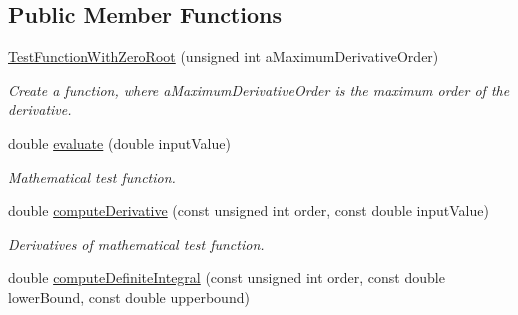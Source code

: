 \subsection*{Public Member Functions}
\begin{DoxyCompactItemize}
\item 
\hyperlink{structtudat_1_1unit__tests_1_1TestFunctionWithZeroRoot_a6c33e4dde20b4c5140187202cdb61990}{Test\+Function\+With\+Zero\+Root} (unsigned int a\+Maximum\+Derivative\+Order)\hypertarget{structtudat_1_1unit__tests_1_1TestFunctionWithZeroRoot_a6c33e4dde20b4c5140187202cdb61990}{}\label{structtudat_1_1unit__tests_1_1TestFunctionWithZeroRoot_a6c33e4dde20b4c5140187202cdb61990}

\begin{DoxyCompactList}\small\item\em Create a function, where a\+Maximum\+Derivative\+Order is the maximum order of the derivative. \end{DoxyCompactList}\item 
double \hyperlink{structtudat_1_1unit__tests_1_1TestFunctionWithZeroRoot_a48ea1d8818820199485e588721d198f1}{evaluate} (double input\+Value)\hypertarget{structtudat_1_1unit__tests_1_1TestFunctionWithZeroRoot_a48ea1d8818820199485e588721d198f1}{}\label{structtudat_1_1unit__tests_1_1TestFunctionWithZeroRoot_a48ea1d8818820199485e588721d198f1}

\begin{DoxyCompactList}\small\item\em Mathematical test function. \end{DoxyCompactList}\item 
double \hyperlink{structtudat_1_1unit__tests_1_1TestFunctionWithZeroRoot_a8fb918e0e9e380dd493683892579336a}{compute\+Derivative} (const unsigned int order, const double input\+Value)\hypertarget{structtudat_1_1unit__tests_1_1TestFunctionWithZeroRoot_a8fb918e0e9e380dd493683892579336a}{}\label{structtudat_1_1unit__tests_1_1TestFunctionWithZeroRoot_a8fb918e0e9e380dd493683892579336a}

\begin{DoxyCompactList}\small\item\em Derivatives of mathematical test function. \end{DoxyCompactList}\item 
double \hyperlink{structtudat_1_1unit__tests_1_1TestFunctionWithZeroRoot_a668c0a82b75c8a1edcb94bdd8f923f7e}{compute\+Definite\+Integral} (const unsigned int order, const double lower\+Bound, const double upperbound)\hypertarget{structtudat_1_1unit__tests_1_1TestFunctionWithZeroRoot_a668c0a82b75c8a1edcb94bdd8f923f7e}{}\label{structtudat_1_1unit__tests_1_1TestFunctionWithZeroRoot_a668c0a82b75c8a1edcb94bdd8f923f7e}


\end{DoxyCompactItemize}
